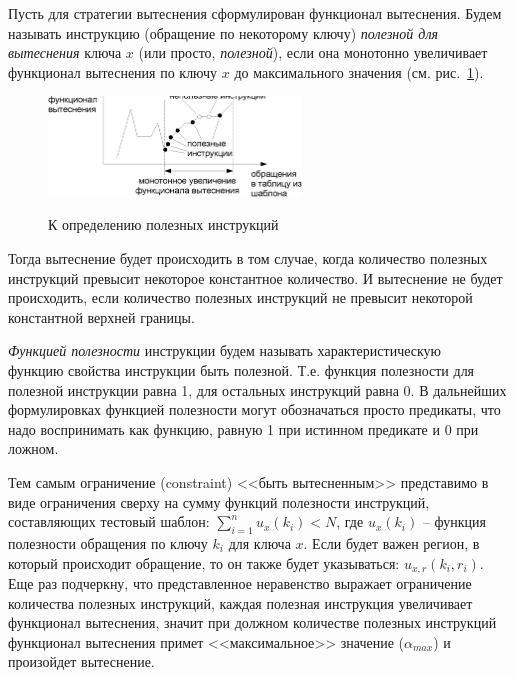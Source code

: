 Пусть для стратегии вытеснения сформулирован функционал вытеснения. Будем называть
инструкцию (обращение по некоторому ключу) \emph{полезной для вытеснения} ключа
$x$ (или просто, \emph{полезной}), если она монотонно увеличивает функционал вытеснения по
ключу $x$ до максимального значения (см. рис.~\ref{useful}).

\begin{figure}[h] \center
  \includegraphics[width=0.6\textwidth]{2.theor/useful}\\
  \caption{К определению полезных инструкций}\label{useful}
\end{figure}

Тогда вытеснение будет происходить в том случае, когда количество
полезных инструкций превысит некоторое константное количество.
И вытеснение не будет происходить, если количество полезных инструкций
не превысит некоторой константной верхней границы.

\emph{Функцией полезности} инструкции будем называть характеристическую\\ функцию
свойства инструкции быть полезной. Т.е. функция полезности для полезной
инструкции равна 1, для остальных инструкций равна 0. В дальнейших формулировках
функцией полезности могут обозначаться просто предикаты, что надо воспринимать
как функцию, равную 1 при истинном предикате и 0 при ложном.

Тем самым ограничение (constraint) <<быть вытесненным>> представимо в виде
ограничения сверху на сумму функций полезности инструкций, составляющих тестовый
шаблон: $\sum_{i=1}^n u_x(k_i) < N$, где $u_x(k_i)$ -- функция полезности
обращения по ключу $k_i$ для ключа $x$. Если будет важен регион, в который
происходит обращение, то он также будет указываться: $u_{x,r}(k_i, r_i)$. Еще
раз подчеркну, что представленное неравенство выражает ограничение количества
полезных инструкций, каждая полезная инструкция увеличивает функционал вытеснения,
значит при должном количестве полезных инструкций функционал вытеснения примет
<<максимальное>> значение ($\alpha_{max}$) и произойдет вытеснение.

